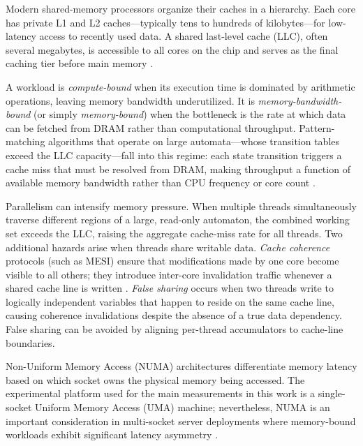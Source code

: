 
Modern shared-memory processors organize their caches in a hierarchy. Each core has private L1 and L2 caches—typically tens to hundreds of kilobytes—for low-latency access to recently used data. A shared last-level cache (LLC), often several megabytes, is accessible to all cores on the chip and serves as the final caching tier before main memory \cite{Pacheco2011}.

A workload is \textit{compute-bound} when its execution time is dominated by arithmetic operations, leaving memory bandwidth underutilized. It is \textit{memory-bandwidth-bound} (or simply \textit{memory-bound}) when the bottleneck is the rate at which data can be fetched from DRAM rather than computational throughput. Pattern-matching algorithms that operate on large automata—whose transition tables exceed the LLC capacity—fall into this regime: each state transition triggers a cache miss that must be resolved from DRAM, making throughput a function of available memory bandwidth rather than CPU frequency or core count \cite{Grama2003}.

Parallelism can intensify memory pressure. When multiple threads simultaneously traverse different regions of a large, read-only automaton, the combined working set exceeds the LLC, raising the aggregate cache-miss rate for all threads. Two additional hazards arise when threads share writable data. \textit{Cache coherence} protocols (such as MESI) ensure that modifications made by one core become visible to all others; they introduce inter-core invalidation traffic whenever a shared cache line is written \cite{Pacheco2011}. \textit{False sharing} occurs when two threads write to logically independent variables that happen to reside on the same cache line, causing coherence invalidations despite the absence of a true data dependency. False sharing can be avoided by aligning per-thread accumulators to cache-line boundaries.

Non-Uniform Memory Access (NUMA) architectures differentiate memory latency based on which socket owns the physical memory being accessed. The experimental platform used for the main measurements in this work is a single-socket Uniform Memory Access (UMA) machine; nevertheless, NUMA is an important consideration in multi-socket server deployments where memory-bound workloads exhibit significant latency asymmetry \cite{Grama2003}.

\newpage
{}

